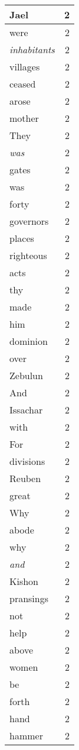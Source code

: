 \begin{center}
\begin{longtable}{l|r}
Jael & 2\\ \hline 
were & 2\\ \hline 
\emph{inhabitants} & 2\\ \hline 
villages & 2\\ \hline 
ceased & 2\\ \hline 
arose & 2\\ \hline 
mother & 2\\ \hline 
They & 2\\ \hline 
\emph{was} & 2\\ \hline 
gates & 2\\ \hline 
was & 2\\ \hline 
forty & 2\\ \hline 
governors & 2\\ \hline 
places & 2\\ \hline 
righteous & 2\\ \hline 
acts & 2\\ \hline 
thy & 2\\ \hline 
made & 2\\ \hline 
him & 2\\ \hline 
dominion & 2\\ \hline 
over & 2\\ \hline 
Zebulun & 2\\ \hline 
And & 2\\ \hline 
Issachar & 2\\ \hline 
with & 2\\ \hline 
For & 2\\ \hline 
divisions & 2\\ \hline 
Reuben & 2\\ \hline 
great & 2\\ \hline 
Why & 2\\ \hline 
abode & 2\\ \hline 
why & 2\\ \hline 
\emph{and} & 2\\ \hline 
Kishon & 2\\ \hline 
pransings & 2\\ \hline 
not & 2\\ \hline 
help & 2\\ \hline 
above & 2\\ \hline 
women & 2\\ \hline 
be & 2\\ \hline 
forth & 2\\ \hline 
hand & 2\\ \hline 
hammer & 2\\ \hline 

\end{longtable}
\end{center}
